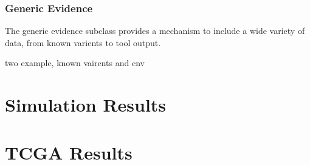 \documentclass[11pt]{article}
\begin{document}
\subsubsection{Generic Evidence}

The generic evidence subclass provides a mechanism to include a wide variety of
data, from known varients to tool output.

two example, known vairents and cnv


\section{Simulation Results}
\section{TCGA Results}



\end{document}
